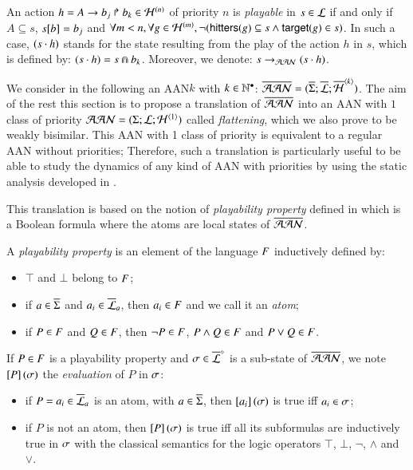 \begin{definition}
\label{def:playp}
  An action $h = A\rightarrow b_j\Rsh b_k \in \mathcal{H}^{(n)}$ of priority $n$
  is \emph{playable} in $s \in \mathcal{L}$
  if and only if $A \subseteq s$, ${s[b]} = b_j$ and
  $\forall m < n, \forall g \in \mathcal{H}^{(m)},
    \neg (\mathsf{hitters}(g) \subseteq s \wedge \mathsf{target}(g) \in s)$.
  In such a case, $(s \cdot h)$ stands for the state resulting from the play
  of the action $h$ in $s$, which is defined by: $(s \cdot h) = s \Cap b_k$.
  Moreover, we denote: $s \rightarrow_{\mathcal{AAN}} (s \cdot h)$.
\end{definition}

We consider in the following an AAN$k$ with $k \in \mathbb{N}^\bullet$:
$\overline{\mathcal{AAN}} = (\overline{\Sigma}; \overline{\mathcal{L}}; \overline{\mathcal{H}}^{{\langle k \rangle}})$.
The aim of the rest this section is to propose a translation of $\overline{\mathcal{AAN}}$
into an AAN with $1$ class of priority $\mathcal{AAN} = (\Sigma; \mathcal{L}; \mathcal{H}^{{\langle 1 \rangle}})$
called \emph{flattening}, which we also prove to be weakly bisimilar.
This AAN with 1 class of priority is equivalent to a regular AAN without priorities;
Therefore, such a translation is particularly useful to be able to study the dynamics of
any kind of AAN with priorities by using the static analysis developed in .

This translation is based on the notion of \emph{playability property} defined in 
which is a Boolean formula where the atoms are local states of $\overline{\mathcal{AAN}}$.

\begin{definition}
  \label{def:pp}
  A \emph{playability property} is an element of the language $F$ inductively defined by:
  \begin{itemize}
    \item $\top$ and $\bot$ belong to $F$;
    \item if $a \in \overline{\Sigma}$ and $a_i \in \overline{\mathcal{L}}_a$, then $a_i \in F$ and we call it an \emph{atom};
    \item if $P \in F$ and $Q \in F$, then $\neg P \in F$, $P \wedge Q \in F$ and $P \vee Q \in F$.
  \end{itemize}
  If $P \in F$ is a playability property and $\sigma \in \overline{\mathcal{L}}^{\diamond}$ is a sub-state of $\overline{\mathcal{AAN}}$,
  we note $\left[P\right](\sigma)$ the \emph{evaluation} of $P$ in $\sigma$:
  \begin{itemize}
    \item if $P = a_i \in \overline{\mathcal{L}}_a$ is an atom, with $a \in \overline{\Sigma}$, then $\left[a_i\right](\sigma)$ is true iff $a_i \in \sigma$;
    \item if $P$ is not an atom, then $\left[P\right](\sigma)$ is true iff all its subformulas are inductively true in $\sigma$
      with the classical semantics for the logic operators $\top$, $\bot$, $\neg$, $\wedge$ and $\vee$.
  \end{itemize}
\end{definition}

